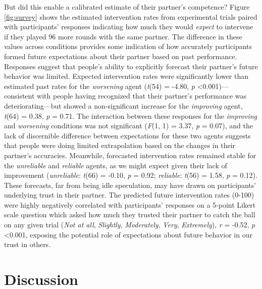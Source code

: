 \documentclass[10pt,letterpaper]{article}
\begin{document}
But did this enable a calibrated estimate of their partner's competence? Figure \ref{fig:survey} shows the estimated intervention rates from experimental trials paired with participants' responses indicating how much they would \textit{expect} to intervene if they played 96 more rounds with the same partner. The difference in these values across conditions provides some indication of how accurately participants formed future expectations about their partner based on past performance. Responses suggest that people's ability to explicitly forecast their partner's future behavior was limited. Expected intervention rates were significantly lower than estimated past rates for the \textit{worsening} agent (\textit{t}(54) = -4.80, \textit{p} \textless{0.001})---consistent with people having recognized that their partner's performance was deteriorating---but showed a non-significant increase for the \textit{improving} agent, \textit{t}(64) = 0.38, \textit{p} = 0.71. The interaction between these responses for the \textit{improving} and \textit{worsening} conditions was not significant (\textit{F}(1, 1) = 3.37, \textit{p} = 0.07), and the lack of discernible difference between expectations for these two agents suggests that people were doing limited extrapolation based on the changes in their partner's accuracies. Meanwhile, forecasted intervention rates remained stable for the \textit{unreliable} and \textit{reliable} agents, as we might expect given their lack of improvement (\textit{unreliable}: \textit{t}(66) = -0.10, \textit{p} = 0.92; \textit{reliable}: \textit{t}(56) = 1.58, \textit{p} = 0.12). These forecasts, far from being idle speculation, may have drawn on participants' underlying trust in their partner. The predicted future intervention rates (0-100) were highly negatively correlated with participants' responses on a 5-point Likert scale question which asked how much they trusted their partner to catch the ball on any given trial (\textit{Not at all}, \textit{Slightly}, \textit{Moderately}, \textit{Very}, \textit{Extremely}), \textit{r} = -0.52, \textit{p} \textless{0.001}, exposing the potential role of expectations about future behavior in our trust in others.


\section{Discussion}
\end{document}
